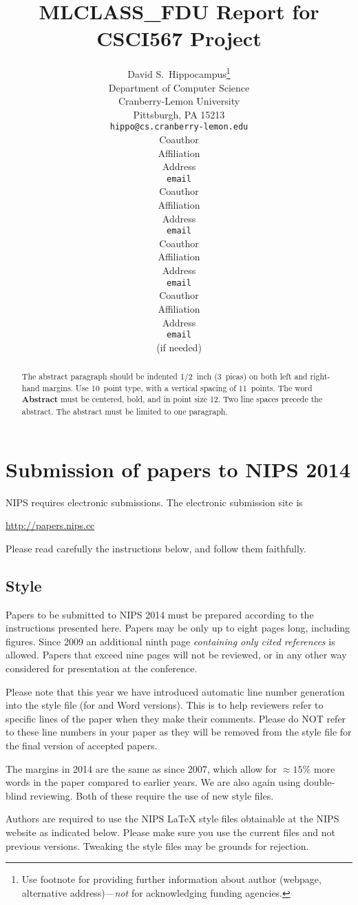 \documentclass{article} %
\title{MLCLASS\_FDU Report for CSCI567 Project}
\author{
David S.~Hippocampus\thanks{ Use footnote for providing further information
about author (webpage, alternative address)---\emph{not} for acknowledging
funding agencies.} \\
Department of Computer Science\\
Cranberry-Lemon University\\
Pittsburgh, PA 15213 \\
\texttt{hippo@cs.cranberry-lemon.edu} \\
\And
Coauthor \\
Affiliation \\
Address \\
\texttt{email} \\
\AND
Coauthor \\
Affiliation \\
Address \\
\texttt{email} \\
\And
Coauthor \\
Affiliation \\
Address \\
\texttt{email} \\
\And
Coauthor \\
Affiliation \\
Address \\
\texttt{email} \\
(if needed)\\
}
\begin{document}
\maketitle

\begin{abstract}
The abstract paragraph should be indented 1/2~inch (3~picas) on both left and
right-hand margins. Use 10~point type, with a vertical spacing of 11~points.
The word \textbf{Abstract} must be centered, bold, and in point size 12. Two
line spaces precede the abstract. The abstract must be limited to one
paragraph.
\end{abstract}

\section{Submission of papers to NIPS 2014}

NIPS requires electronic submissions.  The electronic submission site is  
\begin{center}
   \url{http://papers.nips.cc}
\end{center}

Please read carefully the
instructions below, and follow them faithfully.
\subsection{Style}

Papers to be submitted to NIPS 2014 must be prepared according to the
instructions presented here. Papers may be only up to eight pages long,
including figures. Since 2009 an additional ninth page \textit{containing only
cited references} is allowed. Papers that exceed nine pages will not be
reviewed, or in any other way considered for presentation at the conference.

Please note that this year we have introduced automatic line number generation
into the style file (for \LaTeXe and Word versions). This is to help reviewers
refer to specific lines of the paper when they make their comments. Please do
NOT refer to these line numbers in your paper as they will be removed from the
style file for the final version of accepted papers.

The margins in 2014 are the same as since 2007, which allow for $\approx 15\%$
more words in the paper compared to earlier years. We are also again using 
double-blind reviewing. Both of these require the use of new style files.

Authors are required to use the NIPS \LaTeX{} style files obtainable at the
NIPS website as indicated below. Please make sure you use the current files and
not previous versions. Tweaking the style files may be grounds for rejection.
\end{document}
